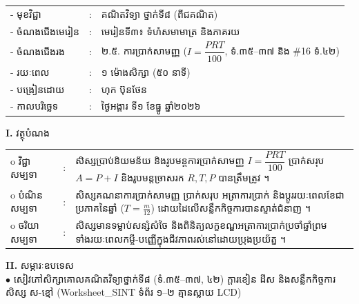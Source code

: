 \documentclass[a4paper,10pt]{article}
\newcommand{\wcirc}{{\CourierBullet\fontsize{9.5pt}{11pt}\selectfont o}}
\newcommand{\en}[1]{{\TimesEn #1}}
\begin{document}
{\renewcommand{\arraystretch}{0.98}
\hspace*{3.1cm}%
\begin{tabular}{@{}l l L{11.0cm}@{}}
  - \hspace{0.35cm} មុខវិជ្ជា & : & គណិតវិទ្យា ថ្នាក់ទី៨ (ពីជគណិត) \\
  - \hspace{0.35cm} ចំណងជើងមេរៀន & : & មេរៀនទី៣៖ ទំហំសមាមាត្រ និងភាគរយ \\
  - \hspace{0.35cm} ចំណងជើងរង & : & ២.៥. ការប្រាក់សាមញ្ញ ($I = \dfrac{PRT}{100}$, ទំ.៣៥–៣៧ និង \#16 ទំ.៤២) \\
  - \hspace{0.35cm} រយៈពេល & : & ១ ម៉ោងសិក្សា (៥០ នាទី) \\
  - \hspace{0.35cm} បង្រៀនដោយ & : & ហុក ប៊ុនថែន \\
  - \hspace{0.35cm} កាលបរិច្ឆេទ & : & ថ្ងៃអង្គារ ទី១ ខែធ្នូ ឆ្នាំ២០២៦ \\
\end{tabular}

\vspace{2pt}

\textbf{I.} {\muol វត្ថុបំណង}\\[1pt]
\hspace*{0.55cm}%
\begin{tabular}{@{}l l L{14.2cm}@{}}
  \wcirc \hspace{0.25cm} វិជ្ជាសម្បទា & : & សិស្សប្រាប់និយមន័យ និងរូបមន្តការប្រាក់សាមញ្ញ $I = \dfrac{PRT}{100}$ ប្រាក់សរុប $A = P + I$ និងរូបមន្តច្រាសរក $R, T, P$ បានត្រឹមត្រូវ ។ \\
  \wcirc \hspace{0.25cm} បំណិនសម្បទា & : & សិស្សគណនាការប្រាក់សាមញ្ញ ប្រាក់សរុប អត្រាការប្រាក់ និងប្ដូររយៈពេលខែជាប្រភាគនៃឆ្នាំ ($T = \frac{m}{12}$) ដោយដៃលើសន្លឹកកិច្ចការបានស្ទាត់ជំនាញ ។ \\
  \wcirc \hspace{0.25cm} ចរិយាសម្បទា & : & សិស្សមានទម្លាប់សន្សំសំចៃ និងពិនិត្យលក្ខខណ្ឌអត្រាការប្រាក់ប្រចាំឆ្នាំព្រមទាំងរយៈពេលកម្ចី-បញ្ញើក្នុងជីវភាពរស់នៅដោយប្រុងប្រយ័ត្ន ។ \\
\end{tabular}

\vspace{2pt}

\textbf{II.} {\muol សម្ភារៈឧបទេស}\\[1pt]
\hspace*{0.55cm}$\bullet$ \hspace{0.35cm} សៀវភៅសិក្សាគោលគណិតវិទ្យាថ្នាក់ទី៨ (ទំ.៣៥–៣៧, ៤២) ក្ដារខៀន ដីស និងសន្លឹកកិច្ចការសិស្ស ស-ខ្មៅ (\en{Worksheet\_SINT} ទំព័រ ១–២ គ្មានស្លាយ \en{LCD})

}
\end{document}
